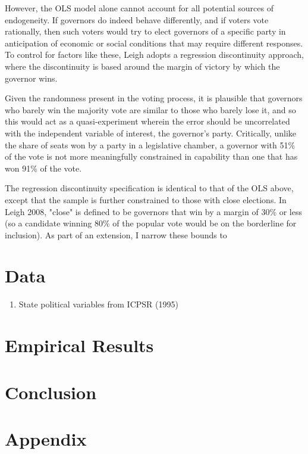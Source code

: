\documentclass{article}
\begin{document}
However, the OLS model alone cannot account for all potential sources of endogeneity. If governors do indeed behave differently, and if voters vote rationally, then such voters would try to elect governors of a specific party in anticipation of economic or social conditions that may require different responses. To control for factors like these, Leigh adopts a regression discontinuity approach, where the discontinuity is based around the margin of victory by which the governor wins.

Given the randomness present in the voting process, it is plausible that governors who barely win the majority vote are similar to those who barely lose it, and so this would act as a quasi-experiment wherein the error should be uncorrelated with the independent variable of interest, the governor's party. Critically, unlike the share of seats won by a party in a legislative chamber, a governor with 51\% of the vote is not more meaningfully constrained in capability than one that has won 91\% of the vote.

The regression discontinuity specification is identical to that of the OLS above, except that the sample is further constrained to those with close elections. In Leigh 2008, "close" is defined to be governors that win by a margin of 30\% or less (so a candidate winning 80\% of the popular vote would be on the borderline for inclusion). As part of an extension, I narrow these bounds to 

\section{Data}

\begin{enumerate}
\item State political variables from ICPSR (1995)
\end{enumerate}

\section{Empirical Results}



\section{Conclusion}

\section{Appendix}
\end{document}
